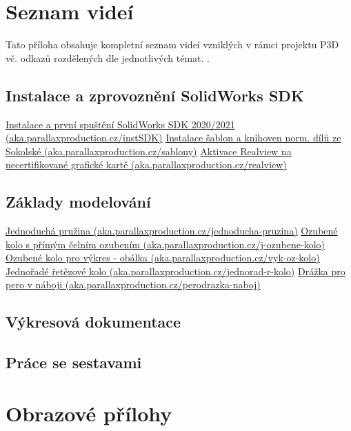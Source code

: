\chapter{Seznam videí}
Tato příloha obsahuje kompletní seznam videí vzniklých v rámci projektu P3D vč. odkazů rozdělených dle jednotlivých témat. \newline
\noindent{}.

\section{Instalace a zprovoznění SolidWorks SDK}
\href{https://aka.parallaxproduction.cz/instalaceSDK}{Instalace a první spuštění SolidWorks SDK 2020/2021 (aka.parallaxproduction.cz/instSDK)} \newline
\href{https://aka.parallaxproduction.cz/sablony}{Instalace šablon a knihoven norm. dílů ze Sokolské (aka.parallaxproduction.cz/sablony)} \newline
\href{https://aka.parallaxproduction.cz/realview}{Aktivace Realview na necertifikované grafické kartě (aka.parallaxproduction.cz/realview)} \newline

\section{Základy modelování}
\href{https://aka.parallaxproduction.cz/jednoducha-pruzina}{Jednoduchá pružina (aka.parallaxproduction.cz/jednoducha-pruzina)} \newline
\href{https://aka.parallaxproduction.cz/j-ozubene-kolo}{Ozubené kolo s přímým čelním ozubením (aka.parallaxproduction.cz/j-ozubene-kolo)} \newline
\href{https://aka.parallaxproduction.cz/vyk-oz-kolo}{Ozubené kolo pro výkres - obálka (aka.parallaxproduction.cz/vyk-oz-kolo)} \newline
\href{https://aka.parallaxproduction.cz/jednorad-r-kolo}{Jednořadé řetězové kolo (aka.parallaxproduction.cz/jednorad-r-kolo)} \newline
\href{https://aka.parallaxproduction.cz/perodrazka-naboj}{Drážka pro pero v náboji (aka.parallaxproduction.cz/perodrazka-naboj)} \newline

\section{Výkresová dokumentace}


\section{Práce se sestavami}


\chapter{Obrazové přílohy}

